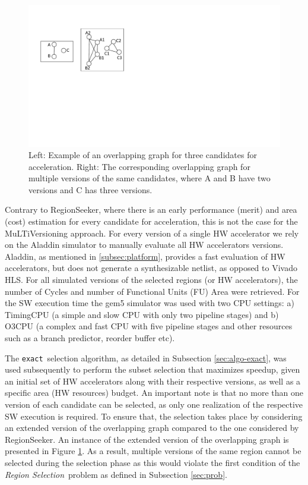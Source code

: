 \documentclass[]{usiinfthesis}
\newcommand{\rseeker}{{RegionSeeker}}
\newcommand{\exact}{\texttt{exact}}
\newcommand{\rsprobname}{\emph{Region Selection}}
\begin{document}
\begin{figure}[t]
\centering
\vspace{-0.5cm}
\includegraphics[width= 0.6 \linewidth]{figs/multi_conflict}
\caption{
Left: Example of an overlapping graph for three candidates for acceleration.
Right: The corresponding overlapping graph for multiple versions of the same candidates, where
A and B have two versions and C has three versions.
}
\vspace*{-0.5cm}
\label{fig:mlv_overlap}
\end{figure}

Contrary to RegionSeeker, where there is an early performance (merit) and area (cost) estimation 
for every candidate for acceleration, this is not the case for the MuLTiVersioning approach. 
For every version of a single HW accelerator we rely on the Aladdin simulator to manually evaluate all 
HW accelerators versions.
Aladdin, as mentioned in \ref{subsec:platform}, provides a fast evaluation of HW accelerators, but does 
not generate a synthesizable netlist, as opposed to Vivado HLS. 
For all simulated versions of the selected regions (or HW accelerators), the number of Cycles and number 
of Functional Units (FU) Area were retrieved. For the SW execution time the gem5 simulator 
\cite{BinkertFeb11}
was used with two CPU settings: a) TimingCPU  (a simple and slow CPU with only two pipeline stages)
and b) O3CPU (a complex and fast CPU with five pipeline stages and other resources such as a 
branch predictor, reorder buffer etc). \par

The \exact\ selection algorithm, as detailed in Subsection \ref{sec:algo-exact}, was used subsequently 
to perform the subset selection that maximizes speedup, 
given an initial set of HW accelerators along with their respective versions, as well as a specific 
area (HW resources) budget. An important note is that no more than one version of each candidate 
can be selected, as only one realization of the respective SW execution is required.
To ensure that, the selection takes place by considering an extended version of the overlapping graph compared to the 
one considered by \rseeker. An instance of the extended version of the overlapping graph is presented in 
Figure \ref{fig:mlv_overlap}.
As a result, multiple versions of the same region cannot be selected during the selection phase as this 
would violate the first condition of the \rsprobname\ problem as defined in Subsection \ref{sec:prob}.
\end{document}
